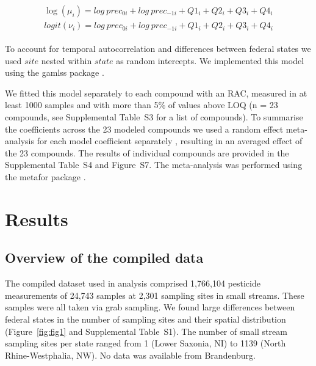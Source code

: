 \documentclass[journal=esthag,manuscript=article]{achemso}
\begin{document}
\begin{align}
\begin{split}
\log(\mu_{i}) = log~prec_{0 i} + log~prec_{-1 i} + Q1_{i} + Q2_{i}+Q3_{i}+Q4_{i}\\
logit(\nu_{i}) = log~prec_{0 i} + log~prec_{-1 i} + Q1_{i} + Q2_{i}+Q3_{i}+Q4_{i}
\end{split}
\label{eqn:eqn4}
\end{align}

To account for temporal autocorrelation and differences between federal states we used $site$ nested within $state$ as random intercepts.
We implemented this model using the gamlss package \cite{stasinopoulos_generalized_2007}. 

We fitted this model separately to each compound with an RAC, measured in at least 1000 samples and with more than 5\% of values above LOQ (n = 23 compounds, see Supplemental Table~S3 for a list of compounds). 
To summarise the coefficients across the 23 modeled compounds we used a random effect meta-analysis for each model coefficient separately \citep{harrison_getting_2011}, resulting in an averaged effect of the 23 compounds.
The results of individual compounds are provided in the Supplemental Table~S4 and Figure~S7.
The meta-analysis was performed using the metafor package \citep{Viechtbauer_2010}. 



\section{Results}
\subsection{Overview of the compiled data}

The compiled dataset used in analysis comprised 1,766,104 pesticide measurements of 24,743 samples at 2,301 sampling sites in small streams.  %
These samples were all taken via grab sampling.  
We found large differences between federal states in the number of sampling sites and their spatial distribution (Figure~\ref{fig:fig1} and Supplemental Table~S1). 
The number of small stream sampling sites per state ranged from 1 (Lower Saxonia, NI) to 1139 (North Rhine-Westphalia, NW).
No data was available from Brandenburg. 
\end{document}

